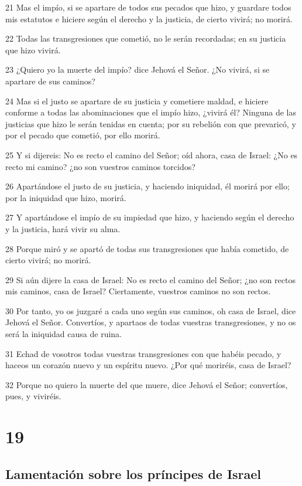\par 21 Mas el impío, si se apartare de todos sus pecados que hizo, y guardare todos mis estatutos e hiciere según el derecho y la justicia, de cierto vivirá; no morirá.
\par 22 Todas las transgresiones que cometió, no le serán recordadas; en su justicia que hizo vivirá.
\par 23 ¿Quiero yo la muerte del impío? dice Jehová el Señor. ¿No vivirá, si se apartare de sus caminos?
\par 24 Mas si el justo se apartare de su justicia y cometiere maldad, e hiciere conforme a todas las abominaciones que el impío hizo, ¿vivirá él? Ninguna de las justicias que hizo le serán tenidas en cuenta; por su rebelión con que prevaricó, y por el pecado que cometió, por ello morirá.
\par 25 Y si dijereis: No es recto el camino del Señor; oíd ahora, casa de Israel: ¿No es recto mi camino? ¿no son vuestros caminos torcidos?
\par 26 Apartándose el justo de su justicia, y haciendo iniquidad, él morirá por ello; por la iniquidad que hizo, morirá.
\par 27 Y apartándose el impío de su impiedad que hizo, y haciendo según el derecho y la justicia, hará vivir su alma.
\par 28 Porque miró y se apartó de todas sus transgresiones que había cometido, de cierto vivirá; no morirá.
\par 29 Si aún dijere la casa de Israel: No es recto el camino del Señor; ¿no son rectos mis caminos, casa de Israel? Ciertamente, vuestros caminos no son rectos.
\par 30 Por tanto, yo os juzgaré a cada uno según sus caminos, oh casa de Israel, dice Jehová el Señor. Convertíos, y apartaos de todas vuestras transgresiones, y no os será la iniquidad causa de ruina.
\par 31 Echad de vosotros todas vuestras transgresiones con que habéis pecado, y haceos un corazón nuevo y un espíritu nuevo. ¿Por qué moriréis, casa de Israel?
\par 32 Porque no quiero la muerte del que muere, dice Jehová el Señor; convertíos, pues, y viviréis.

\chapter{19}

\section*{Lamentación sobre los príncipes de Israel}

